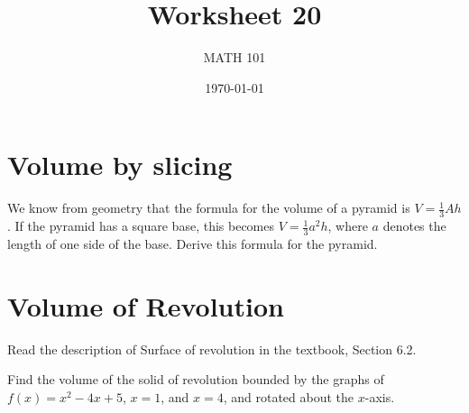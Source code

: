 \documentclass[12pt]{amsart}
\title{ Worksheet 20}
\author{MATH 101}
\date{\today}
\begin{document}
\maketitle

\section*{Volume by slicing}

\begin{problem}
We know from geometry that the formula for the volume of a pyramid is $V=\frac{1}{3}Ah$.
If the pyramid has a square base, this becomes $V=\frac{1}{3}a^2h$,
where $a$ denotes the length of one side of the base.
Derive this formula for the pyramid.
\end{problem}



\newpage



\section*{Volume of Revolution}
Read the description of Surface of revolution in the textbook, Section 6.2.

\begin{problem}
Find the volume of the solid of revolution bounded by the graphs of $f(x)=x^2-4x+5$, $x=1$, and $x=4$,
and rotated about the $x$-axis.
\end{problem}
\end{document}
